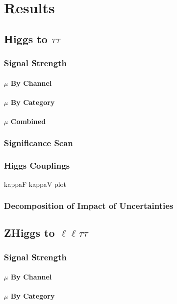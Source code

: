 \chapter{Results}

\section{Higgs to $\tau\tau$}

\subsection{Signal Strength}
\subsubsection{$\mu$ By Channel}
\subsubsection{$\mu$ By Category}
\subsubsection{$\mu$ Combined}
\subsection{Significance Scan}
\subsection{Higgs Couplings}
kappaF kappaV plot
\subsection{Decomposition of Impact of Uncertainties}

\section{ZHiggs to $\ell\ell\tau\tau$}

\subsection{Signal Strength}
\subsubsection{$\mu$ By Channel}
\subsubsection{$\mu$ By Category}
